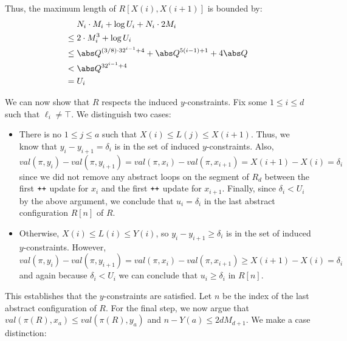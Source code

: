 Thus, the maximum length of $R[X(i),X(i+1)]$ is bounded by:
%
\begin{align*}
  & N_i \cdot M_i + \log U_i + N_i \cdot 2M_i\\
  \le {} & 2 \cdot M_i^3 + \log U_i\\
  \le {} & \abs Q^{(3/8)\cdot 32^{i-1}+4} + \abs Q^{5(i-1)+1}+4\abs Q\\
  < {} & \abs Q^{32^{i-1}+4}\\
  = {} & U_i
\end{align*}

We can now show that $R$ respects the induced $y$-constraints. Fix
some $1\le i\le d$ such that $\ell_i\neq \top$. We distinguish two
cases:
\begin{itemize}
\item  There is no $1\le j\le a$ such that $X(i)\le L(j)\le X(i+1)$. Thus, we know that $y_i-y_{i+1}=\delta_i$ is in the set of induced $y$-constraints. Also, $val(\pi,y_i)-val(\pi,y_{i+1}) = val(\pi,x_i)-val(\pi,x_{i+1}) = X(i+1)-X(i) = \delta_i$ since we did not remove any abstract loops on the segment of $R_d$ between the first ${\normalfont{\texttt{{++}}}}$ update for $x_i$ and the first ${\normalfont{\texttt{{++}}}}$ update for $x_{i+1}$. Finally, since $\delta_i<U_i$ by the above argument, we conclude that $u_i=\delta_i$ in the last abstract
configuration $R[n]$ of $R$. 
\item Otherwise, $X(i)\le L(i)\le Y(i)$, so $y_i-y_{i+1}\ge\delta_i$ 
is in the set of induced $y$-constraints. However, $val(\pi,y_i)-val(\pi,y_{i+1}) = val(\pi,x_i)-val(\pi,x_{i+1}) \ge X(i+1)-X(i) = \delta_i$ and again because $\delta_i<U_i$ we can conclude that $u_i\ge \delta_i$ in $R[n]$.
\end{itemize}
%
This establishes that the $y$-constraints are satisfied.  Let $n$ be
the index of the last abstract configuration of $R$. For the final
step, we now argue that $val(\pi(R),x_a)\le val(\pi(R),y_a)$ and $n-Y(a)\le
2dM_{d+1}$. We make a case distinction:
%
